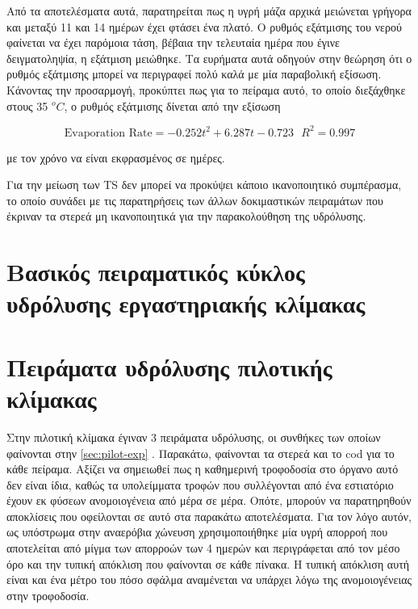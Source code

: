 \documentclass[11pt]{report}
\begin{document}
\begin{enumerate}
Από τα αποτελέσματα αυτά, παρατηρείται πως η υγρή μάζα αρχικά μειώνεται γρήγορα και μεταξύ 11 και 14 ημέρων έχει φτάσει ένα πλατό. Ο ρυθμός εξάτμισης του νερού φαίνεται να έχει παρόμοια τάση, βέβαια την τελευταία ημέρα που έγινε δειγματοληψία, η εξάτμιση μειώθηκε. Τα ευρήματα αυτά οδηγούν στην θεώρηση ότι ο ρυθμός εξάτμισης μπορεί να περιγραφεί πολύ καλά με μία παραβολική εξίσωση. Κάνοντας την προσαρμογή, προκύπτει πως για το πείραμα αυτό, το οποίο διεξάχθηκε στους 35 \(^oC\), ο ρυθμός εξάτμισης δίνεται από την εξίσωση

\[ \text{Evaporation Rate} = -0.252t^2 + 6.287t - 0.723 ~ ~ ~ R^2 = 0.997 \]

με τον χρόνο να είναι εκφρασμένος σε ημέρες.

Για την μείωση των TS δεν μπορεί να προκύψει κάποιο ικανοποιητικό συμπέρασμα, το οποίο συνάδει με τις παρατηρήσεις των άλλων δοκιμαστικών πειραμάτων που έκριναν τα στερεά μη ικανοποιητικά για την παρακολούθηση της υδρόλυσης.
\end{enumerate}

\section{Βασικός πειραματικός κύκλος υδρόλυσης εργαστηριακής κλίμακας}
\label{sec:org0639dc7}

\section{Πειράματα υδρόλυσης πιλοτικής κλίμακας}
\label{sec:orgee60be0}
Στην πιλοτική κλίμακα έγιναν 3 πειράματα υδρόλυσης, οι συνθήκες των οποίων φαίνονται στην \autoref{sec:pilot-exp} . Παρακάτω, φαίνονται τα στερεά και το \acrshort{cod} για το κάθε πείραμα. Αξίζει να σημειωθεί πως η καθημερινή τροφοδοσία στο όργανο αυτό δεν είναι ίδια, καθώς τα υπολείμματα τροφών που συλλέγονται από ένα εστιατόριο έχουν εκ φύσεων ανομοιογένεια από μέρα σε μέρα. Οπότε, μπορούν να παρατηρηθούν αποκλίσεις που οφείλονται σε αυτό στα παρακάτω αποτελέσματα. Για τον λόγο αυτόν, ως υπόστρωμα στην αναερόβια χώνευση χρησιμοποιήθηκε μία υγρή απορροή που αποτελείται από μίγμα των απορροών των 4 ημερών και περιγράφεται από τον μέσο όρο και την τυπική απόκλιση που φαίνονται σε κάθε πίνακα. Η τυπική απόκλιση αυτή είναι και ένα μέτρο του πόσο σφάλμα αναμένεται να υπάρχει λόγω της ανομοιογένειας στην τροφοδοσία.
\end{document}
